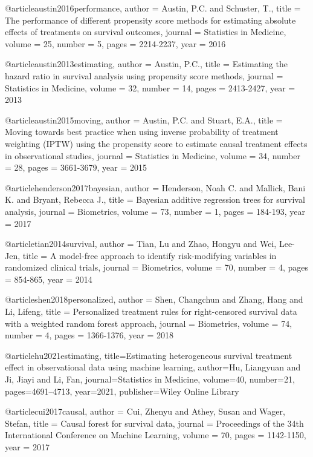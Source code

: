 @article{austin2016performance,
  author = {Austin, P.C. and Schuster, T.},
  title = {The performance of different propensity score methods for estimating absolute effects of treatments on survival outcomes},
  journal = {Statistics in Medicine},
  volume = {25},
  number = {5},
  pages = {2214-2237},
  year = {2016}
}

@article{austin2013estimating,
  author = {Austin, P.C.},
  title = {Estimating the hazard ratio in survival analysis using propensity score methods},
  journal = {Statistics in Medicine},
  volume = {32},
  number = {14},
  pages = {2413-2427},
  year = {2013}
}

@article{austin2015moving,
  author = {Austin, P.C. and Stuart, E.A.},
  title = {Moving towards best practice when using inverse probability of treatment weighting (IPTW) using the propensity score to estimate causal treatment effects in observational studies},
  journal = {Statistics in Medicine},
  volume = {34},
  number = {28},
  pages = {3661-3679},
  year = {2015}
}


@article{henderson2017bayesian,
  author = {Henderson, Noah C. and Mallick, Bani K. and Bryant, Rebecca J.},
  title = {Bayesian additive regression trees for survival analysis},
  journal = {Biometrics},
  volume = {73},
  number = {1},
  pages = {184-193},
  year = {2017}
}

@article{tian2014survival,
  author = {Tian, Lu and Zhao, Hongyu and Wei, Lee-Jen},
  title = {A model-free approach to identify risk-modifying variables in randomized clinical trials},
  journal = {Biometrics},
  volume = {70},
  number = {4},
  pages = {854-865},
  year = {2014}
}

@article{shen2018personalized,
  author = {Shen, Changchun and Zhang, Hang and Li, Lifeng},
  title = {Personalized treatment rules for right-censored survival data with a weighted random forest approach},
  journal = {Biometrics},
  volume = {74},
  number = {4},
  pages = {1366-1376},
  year = {2018}
}

@article{hu2021estimating,
  title={Estimating heterogeneous survival treatment effect in observational data using machine learning},
  author={Hu, Liangyuan and Ji, Jiayi and Li, Fan},
  journal={Statistics in Medicine},
  volume={40},
  number={21},
  pages={4691--4713},
  year={2021},
  publisher={Wiley Online Library}
}



@article{cui2017causal,
  author = {Cui, Zhenyu and Athey, Susan and Wager, Stefan},
  title = {Causal forest for survival data},
  journal = {Proceedings of the 34th International Conference on Machine Learning},
  volume = {70},
  pages = {1142-1150},
  year = {2017}
}

